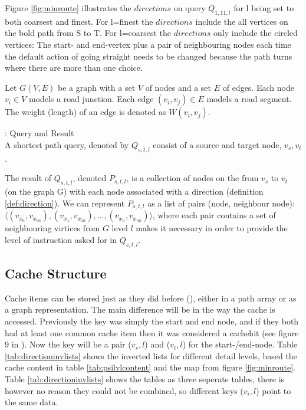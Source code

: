 Figure \ref{fig:minroute} illustrates the $directions$ on query $Q_{1,11,l}$ for l being set to both coarsest and finest. For l=finest the $directions$ include the all vertices on the bold path from S to T. For l=coarsest the $directions$ only include the circled vertices: The start- and end-vertex plus a pair of neighbouring nodes each time the default action of going straight needs to be changed because the path turns where there are more than one choice.

\begin{definition}
Let $G(V, E)$ be a graph with a set $V$ of nodes and a set $E$ of edges.
Each node $v_i \in V$ models a road junction. Each edge $(v_i, v_j) \in
E$ models a road segment. The weight (length) of an edge is denoted as $W(v_i, v_j)$.
\end{definition}


\begin{definition}{\spathns: Query and Result}\\
A shortest path query, denoted by $Q_{s,t,l}$ consist of a source and target node, $v_s,v_t$.

The result of $Q_{s,t,l}$, denoted $P_{s,t,l}$, is a collection of nodes on the \spath from $v_s$ to $v_t$ (on the graph G) with each node associated with a direction (definition \ref{def:direction}).
We can represent $P_{s,t,l}$ as a list of pairs (node, neighbour node): $\langle (v_{x_0},v_{x_{0n}}), (v_{x_1},v_{x_{1n}}), \dots ,(v_{x_n},v_{x_{nn}}) \rangle$, where each pair contains a set of neighbouring virtices from $G$ level $l$ makes it necessary in order to provide the level of instruction asked for in $Q_{s,t,l}$.
\end{definition}




\subsection{Cache Structure}

Cache items can be stored just as they did before (\cite{thomsen2012}), either in a path array or as a graph representation. The main difference will be in the way the cache is accessed. Previously the key was simply the start and end node, and if they both had at least one common cache item then it was considered a cachehit (see figure 9 in \cite{thomsen2012}). Now the key will be a pair ($v_s, l$) and ($v_t, l$) for the start-/end-node. Table \ref{tab:directioninvlists} shows the inverted lists for different detail levels, based the cache content in table \ref{tab:psilvlcontent} and the map from figure \ref{fig:minroute}. Table \ref{tab:directioninvlists} shows the tables as three seperate tables, there is however no reason they could not be combined, so different keys ($v_i,l$) point to the same data.

